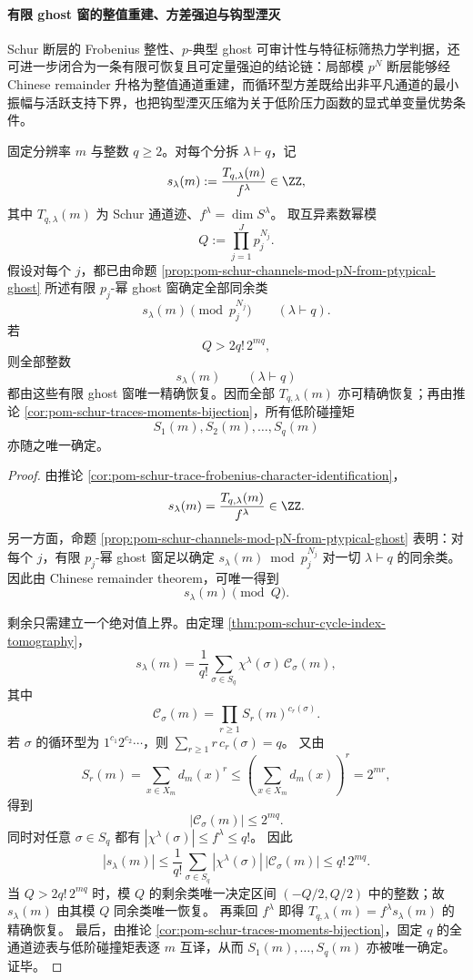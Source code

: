\paragraph{有限 ghost 窗的整值重建、方差强迫与钩型湮灭}
Schur 断层的 Frobenius 整性、\(p\)-典型 ghost 可审计性与特征标筛热力学判据，还可进一步闭合为一条有限可恢复且可定量强迫的结论链：局部模 \(p^N\) 断层能够经 Chinese remainder 升格为整值通道重建，而循环型方差既给出非平凡通道的最小振幅与活跃支持下界，也把钩型湮灭压缩为关于低阶压力函数的显式单变量优势条件。

\begin{theorem}\label{thm:xi-time-part63-schur-crt-exact-recovery}
固定分辨率 \(m\) 与整数 \(q\ge 2\)。对每个分拆 \(\lambda\vdash q\)，记
\[
s_\lambda(m):=\frac{T_{q,\lambda}(m)}{f^\lambda}\in\ZZ,
\]
其中 \(T_{q,\lambda}(m)\) 为 Schur 通道迹、\(f^\lambda=\dim S^\lambda\)。
取互异素数幂模
\[
Q:=\prod_{j=1}^{J}p_j^{N_j}.
\]
假设对每个 \(j\)，都已由命题
\ref{prop:pom-schur-channels-mod-pN-from-ptypical-ghost}
所述有限 \(p_j\)-幂 ghost 窗确定全部同余类
\[
s_\lambda(m)\pmod{p_j^{N_j}}
\qquad(\lambda\vdash q).
\]
若
\[
Q>2q!\,2^{mq},
\]
则全部整数
\[
s_\lambda(m)\qquad(\lambda\vdash q)
\]
都由这些有限 ghost 窗唯一精确恢复。因而全部 \(T_{q,\lambda}(m)\) 亦可精确恢复；再由推论
\ref{cor:pom-schur-traces-moments-bijection}，所有低阶碰撞矩
\[
S_1(m),S_2(m),\dots,S_q(m)
\]
亦随之唯一确定。
\end{theorem}
\begin{proof}
由推论 \ref{cor:pom-schur-trace-frobenius-character-identification}，
\[
s_\lambda(m)=\frac{T_{q,\lambda}(m)}{f^\lambda}\in\ZZ.
\]
另一方面，命题
\ref{prop:pom-schur-channels-mod-pN-from-ptypical-ghost}
表明：对每个 \(j\)，有限 \(p_j\)-幂 ghost 窗足以确定
\(
s_\lambda(m)\bmod p_j^{N_j}
\)
对一切 \(\lambda\vdash q\) 的同余类。
因此由 Chinese remainder theorem，可唯一得到
\[
s_\lambda(m)\pmod Q.
\]

剩余只需建立一个绝对值上界。由定理
\ref{thm:pom-schur-cycle-index-tomography}，
\[
s_\lambda(m)
=
\frac{1}{q!}\sum_{\sigma\in S_q}\chi^\lambda(\sigma)\,\mathcal C_\sigma(m),
\]
其中
\[
\mathcal C_\sigma(m)=\prod_{r\ge 1}S_r(m)^{c_r(\sigma)}.
\]
若 \(\sigma\) 的循环型为 \(1^{c_1}2^{c_2}\cdots\)，则
\(
\sum_{r\ge 1}r\,c_r(\sigma)=q
\)。
又由
\[
S_r(m)=\sum_{x\in X_m}d_m(x)^r\le
\left(\sum_{x\in X_m}d_m(x)\right)^r
=2^{mr},
\]
得到
\[
|\mathcal C_\sigma(m)|\le 2^{mq}.
\]
同时对任意 \(\sigma\in S_q\) 都有
\(
|\chi^\lambda(\sigma)|\le f^\lambda\le q!
\)。
因此
\[
|s_\lambda(m)|
\le
\frac{1}{q!}\sum_{\sigma\in S_q}
|\chi^\lambda(\sigma)|\,|\mathcal C_\sigma(m)|
\le
q!\,2^{mq}.
\]
当 \(Q>2q!\,2^{mq}\) 时，模 \(Q\) 的剩余类唯一决定区间
\(
(-Q/2,Q/2)
\)
中的整数；故 \(s_\lambda(m)\) 由其模 \(Q\) 同余类唯一恢复。
再乘回 \(f^\lambda\) 即得 \(T_{q,\lambda}(m)=f^\lambda s_\lambda(m)\) 的精确恢复。
最后，由推论 \ref{cor:pom-schur-traces-moments-bijection}，固定 \(q\) 的全通道迹表与低阶碰撞矩表逐 \(m\) 互译，从而 \(S_1(m),\dots,S_q(m)\) 亦被唯一确定。证毕。
\end{proof}

